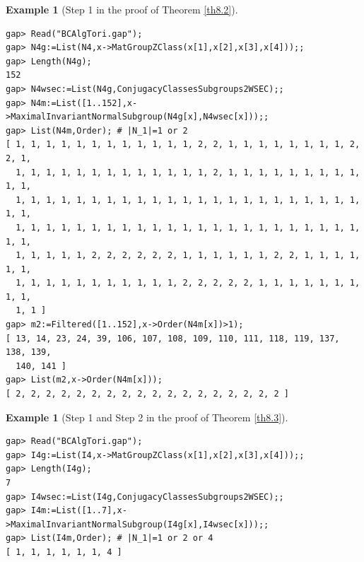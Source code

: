 \documentclass{amsart}
\theoremstyle{plain}
\theoremstyle{definition}
\newtheorem{example}[theorem]{Example}
\theoremstyle{remark}
\begin{document}
{\bigskip
\begin{example}[Step 1 in the proof of Theorem \ref{th8.2}]\label{ex8.8}~\vspace*{-5mm}\\
\begin{verbatim}
gap> Read("BCAlgTori.gap");
gap> N4g:=List(N4,x->MatGroupZClass(x[1],x[2],x[3],x[4]));;
gap> Length(N4g);
152
gap> N4wsec:=List(N4g,ConjugacyClassesSubgroups2WSEC);;
gap> N4m:=List([1..152],x->MaximalInvariantNormalSubgroup(N4g[x],N4wsec[x]));;
gap> List(N4m,Order); # |N_1|=1 or 2
[ 1, 1, 1, 1, 1, 1, 1, 1, 1, 1, 1, 1, 2, 2, 1, 1, 1, 1, 1, 1, 1, 1, 2, 2, 1, 
  1, 1, 1, 1, 1, 1, 1, 1, 1, 1, 1, 1, 1, 2, 1, 1, 1, 1, 1, 1, 1, 1, 1, 1, 1, 
  1, 1, 1, 1, 1, 1, 1, 1, 1, 1, 1, 1, 1, 1, 1, 1, 1, 1, 1, 1, 1, 1, 1, 1, 1, 
  1, 1, 1, 1, 1, 1, 1, 1, 1, 1, 1, 1, 1, 1, 1, 1, 1, 1, 1, 1, 1, 1, 1, 1, 1, 
  1, 1, 1, 1, 1, 2, 2, 2, 2, 2, 2, 1, 1, 1, 1, 1, 1, 2, 2, 1, 1, 1, 1, 1, 1, 
  1, 1, 1, 1, 1, 1, 1, 1, 1, 1, 1, 2, 2, 2, 2, 2, 1, 1, 1, 1, 1, 1, 1, 1, 1, 
  1, 1 ]
gap> m2:=Filtered([1..152],x->Order(N4m[x])>1);
[ 13, 14, 23, 24, 39, 106, 107, 108, 109, 110, 111, 118, 119, 137, 138, 139, 
  140, 141 ]
gap> List(m2,x->Order(N4m[x]));
[ 2, 2, 2, 2, 2, 2, 2, 2, 2, 2, 2, 2, 2, 2, 2, 2, 2, 2 ]
\end{verbatim}
\end{example}

\bigskip
\begin{example}[Step 1 and Step 2 in the proof of Theorem \ref{th8.3}]\label{ex8.9}~\vspace*{-5mm}\\
\begin{verbatim}
gap> Read("BCAlgTori.gap");
gap> I4g:=List(I4,x->MatGroupZClass(x[1],x[2],x[3],x[4]));;
gap> Length(I4g);
7
gap> I4wsec:=List(I4g,ConjugacyClassesSubgroups2WSEC);;
gap> I4m:=List([1..7],x->MaximalInvariantNormalSubgroup(I4g[x],I4wsec[x]));;
gap> List(I4m,Order); # |N_1|=1 or 2 or 4
[ 1, 1, 1, 1, 1, 1, 4 ]


\end{verbatim}
\end{example}}
\end{document}
